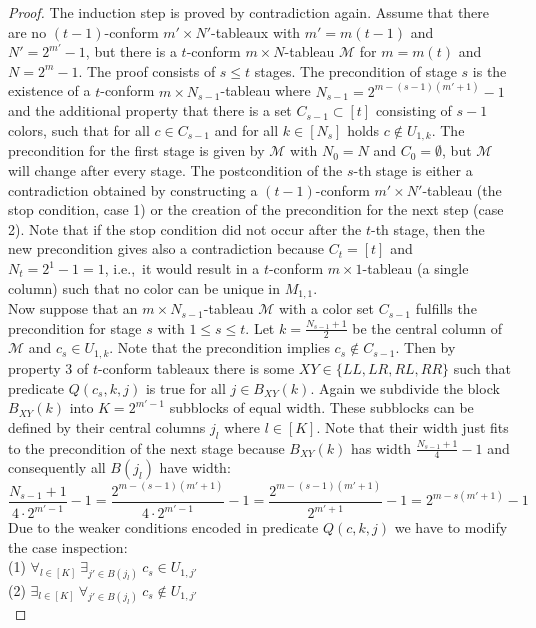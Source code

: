 \documentclass[a4paper,USenglish,numberwithinsect]{lipics}
\theoremstyle{plain}
\begin{document}
\begin{proof}
The induction step is proved by contradiction again. Assume 
that  there are no $(t-1)$-conform
$m'\times N'$-tableaux with $m'=m(t-1)$ and $N'=2^{m'}-1$, but there  is
a $t$-conform
$m\times N$-tableau $\mathcal M$ for $m=m(t)$ and $N=2^{m}-1$.
The proof consists of $s \leq t$ stages. The precondition of stage $s$
is the existence of a $t$-conform $m \times N_{s-1}$-tableau
where $N_{s-1}=2^{m-(s-1)(m'+1)}-1$ and the additional property that there is a
set $C_{s-1} \subset [t]$
consisting of $s-1$ colors, such that for all $c \in C_{s-1}$ and for all
$k \in [N_s]$ holds $c \not \in U_{1,k}$. The precondition for the first
stage is given by  
$\mathcal M$ with $N_0=N$ and $C_0= \emptyset$, but $\mathcal M$ will
change after every stage.
The postcondition  of the $s$-th stage
is either a contradiction obtained by constructing a   $(t-1)$-conform
$m'\times N'$-tableau (the stop condition, case 1) or the creation of
the precondition for the next step
(case 2). Note that if the stop condition did not occur after the $t$-th
stage, then
the new precondition gives also a contradiction because
$C_t=[t]$ and $N_t=2^1-1=1$, i.e.,~it would result in  a $t$-conform
$m \times 1$-tableau (a single column) such that no color can be  unique
in $M_{1,1}$.
\\
Now suppose that an  $m \times N_{s-1}$-tableau $\mathcal M$ with a
color set  $C_{s-1}$ fulfills   the
precondition for stage $s$  with $ 1\leq s \leq t$.
Let $k=\frac{N_{s-1}+1}{2}$ be the central column of ${\mathcal M}$ and
$c_s \in U_{1,k}$.
Note that the precondition implies $c_s \not \in  C_{s-1}$. Then by 
property 3 of $t$-conform
tableaux there is some $XY \in \{LL,LR,RL,RR\}$ such that predicate
$Q(c_s,k,j)$ is true
for all $j \in B_{XY}(k)$. Again we subdivide the block $B_{XY}(k)$
into $K=2^{m'-1}$ subblocks of equal width. These subblocks can be
defined by their central columns
$j_l$ where $l \in [K]$. Note that their width  just fits to the
precondition of the next stage because $B_{XY}(k)$ has width
$\frac{N_{s-1}+1}{4}-1$ and
consequently all  $B(j_l)$  have width:
  \[ \frac{N_{s-1}+1}{4 \cdot 2^{m'-1} }-1 =  \frac{2^{m-(s-1)(m'+1)}}{4
\cdot 2^{m'-1} }-1
= \frac{2^{m-(s-1)(m'+1)}}{2^{m'+1} }-1= 2^{m-s(m'+1)}-1 \]
Due to the weaker conditions encoded in predicate $Q(c,k,j)$ we have to modify the case inspection:\\
(1) $\forall_{l \in [K]} \ \exists_{ j' \in B(j_l)} \ c_s \in U_{1,j'}$\\
(2) $\exists_{ l \in [K]} \ \forall_{ j' \in B(j_l)} \ c_s \not\in U_{1,j'}$\\

\end{proof}
\end{document}
